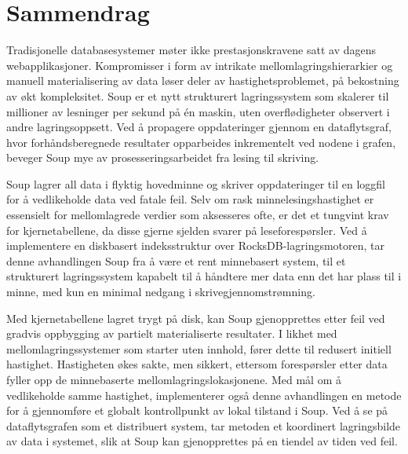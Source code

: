 \section*{Sammendrag}

Tradisjonelle databasesystemer møter ikke prestasjonskravene satt av dagens
webapplikasjoner. Kompromisser i form av intrikate mellomlagringshierarkier og
manuell materialisering av data løser deler av hastighetsproblemet, på
bekostning av økt kompleksitet. Soup er et nytt strukturert lagringssystem som
skalerer til millioner av lesninger per sekund på én maskin, uten
overflødigheter observert i andre lagringsoppsett. Ved å propagere oppdateringer
gjennom en dataflytsgraf, hvor forhåndsberegnede resultater opparbeides
inkrementelt ved nodene i grafen, beveger Soup mye av prosesseringsarbeidet fra
lesing til skriving.

Soup lagrer all data i flyktig hovedminne og skriver oppdateringer til en
loggfil for å vedlikeholde data ved fatale feil. Selv om rask
minnelesingshastighet er essensielt for mellomlagrede verdier som aksesseres
ofte, er det et tungvint krav for kjernetabellene, da disse gjerne sjelden
svarer på leseforespørsler. Ved å implementere en diskbasert indeksstruktur over
RocksDB-lagringsmotoren, tar denne avhandlingen Soup fra å være et rent
minnebasert system, til et strukturert lagringssystem kapabelt til å håndtere
mer data enn det har plass til i minne, med kun en minimal nedgang i
skrivegjennomstrømning.

Med kjernetabellene lagret trygt på disk, kan Soup gjenopprettes etter feil ved
gradvis oppbygging av partielt materialiserte resultater. I likhet med
mellomlagringssystemer som starter uten innhold, fører dette til redusert
initiell hastighet. Hastigheten økes sakte, men sikkert, ettersom forespørsler
etter data fyller opp de minnebaserte mellomlagringslokasjonene. Med mål om å
vedlikeholde samme hastighet, implementerer også denne avhandlingen en metode
for å gjennomføre et globalt kontrollpunkt av lokal tilstand i Soup. Ved å se på
dataflytsgrafen som et distribuert system, tar metoden et koordinert
lagringsbilde av data i systemet, slik at Soup kan gjenopprettes på en tiendel
av tiden ved feil.

\newpage
